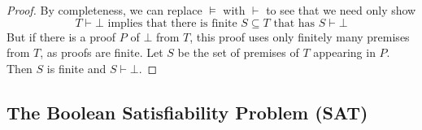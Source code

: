 \documentclass[11pt]{article}
\begin{document}
\begin{proof} 
    By completeness, we can replace $\vDash$ with $\vdash$ to see that we need only show
    \[T \vdash \bot \text{ implies that there is finite } S \subseteq T \text{ that has } S \vdash \bot\]
    But if there is a proof $P$ of $\bot$ from $T$, this proof uses only finitely many premises from $T$, as proofs are finite. Let $S$ be the set of premises of $T$ appearing in $P$. Then $S$ is finite and $S \vdash \bot$.
\end{proof}
\subsection{The Boolean Satisfiability Problem (SAT)}
\printindex
\end{document}
